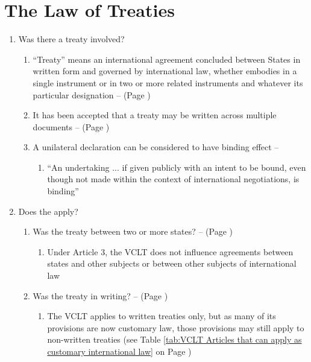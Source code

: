 \section{The Law of Treaties}\label{scaffold:Topic 3}
\begin{enumerate}
    \item Was there a treaty involved?
    \begin{enumerate}
        \item ``Treaty'' means an international agreement concluded between States in written form and governed by international law, whether embodies in a single instrument or in two or more related instruments and whatever its particular designation --  (Page \pageref{VCLT Art 2})
        \item It has been accepted that a treaty may be written across multiple documents --  (Page \pageref{case:Qatar v Bahrain})
        \item A unilateral declaration can be considered to have binding effect -- 
        \begin{enumerate}
            \item ``An undertaking ... if given publicly with an intent to be bound, even though not made within the context of international negotiations, is binding''
        \end{enumerate}
    \end{enumerate}
    \item Does the  apply?
    \begin{enumerate}
        \item Was the treaty between two or more states? --  (Page \pageref{VCLT Art 3})
        \begin{enumerate}
            \item Under Article 3, the VCLT does not influence agreements between states and other subjects or between other subjects of international law
        \end{enumerate}
        \item Was the treaty in writing? --  (Page \pageref{VCLT Art 3})
        \begin{enumerate}
            \item The VCLT applies to written treaties only, but as many of its provisions are now customary law, those provisions may still apply to non-written treaties (see Table \ref{tab:VCLT Articles that can apply as customary international law} on Page \pageref{tab:VCLT Articles that can apply as customary international law})

\end{enumerate}
\end{enumerate}
\end{enumerate}
